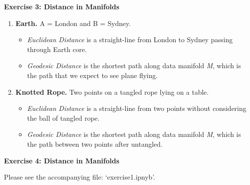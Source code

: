 \documentclass[11pt]{article}
\begin{document}
\noindent
\textbf{Exercise 3: Distance in Manifolds}

\begin{enumerate}[label=(\alph*)]
    \item {
        \textbf{Earth.} A = London and B = Sydney.
        \begin{itemize}
            \item \textit{Euclidean Distance} is a straight-line from London to Sydney passing through Earth core.
            \item \textit{Geodesic Distance} is the shortest path along data manifold \textit{M}, which is the path that we expect to see plane flying.
        \end{itemize}
    }
    \item {
        \textbf{Knotted Rope.} Two points on a tangled rope lying on a table.
        \begin{itemize}
            \item \textit{Euclidean Distance} is a straight-line from two points without considering the ball of tangled rope.
            \item \textit{Geodesic Distance} is the shortest path along data manifold \textit{M}, which is the path between two points after untangled.
        \end{itemize}
    }

\end{enumerate}

\noindent
\textbf{Exercise 4: Distance in Manifolds \\}

\noindent
Please see the accompanying file: `exercise1.ipnyb'.
\end{document}
